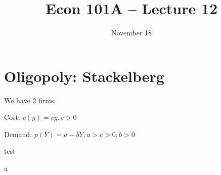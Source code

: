 \documentclass[main.tex]{subfiles}
\title{Econ 101A -- Lecture 12}
\author{\defaultauthor}
\date{November 18}
\begin{document}
\ifSubfilesClassLoaded{\maketitle}{}

\section{Oligopoly: Stackelberg}
We have 2 firms: 

Cost: $c(y) = cy, c > 0$

Demand: $p(Y) = a-bY, a>c>0, b>0$

test 



a
\end{document}

